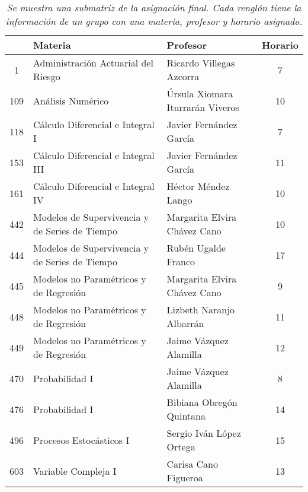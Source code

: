 \begin{table}[H]
\centering
\begin{tabular}{|c|p{7cm}|p{4.7cm}|c|}
\hline
\textbf{ } & \textbf{Materia} & \textbf{Profesor} & \textbf{Horario} \\ \hline
1 & Administración Actuarial del Riesgo & Ricardo Villegas Azcorra & 7 \\ \hline
109 & Análisis Numérico & Úrsula Xiomara Iturrarán Viveros & 10 \\ \hline
118 & Cálculo Diferencial e Integral I & Javier Fernández García & 7 \\ \hline
153 & Cálculo Diferencial e Integral III & Javier Fernández García & 11 \\ \hline
161 & Cálculo Diferencial e Integral IV & Héctor Méndez Lango & 10 \\ \hline
442 & Modelos de Supervivencia y de Series de Tiempo & Margarita Elvira Chávez Cano & 10 \\ \hline
444 & Modelos de Supervivencia y de Series de Tiempo & Rubén Ugalde Franco & 17 \\ \hline
445 & Modelos no Paramétricos y de Regresión & Margarita Elvira Chávez Cano & 9 \\ \hline
448 & Modelos no Paramétricos y de Regresión & Lizbeth Naranjo Albarrán & 11 \\ \hline
449 & Modelos no Paramétricos y de Regresión & Jaime Vázquez Alamilla & 12 \\ \hline
470 & Probabilidad I & Jaime Vázquez Alamilla & 8 \\ \hline
476 & Probabilidad I & Bibiana Obregón Quintana & 14 \\ \hline
496 & Procesos Estocásticos I & Sergio Iván López Ortega & 15 \\ \hline
603 & Variable Compleja I & Carisa Cano Figueroa & 13 \\ \hline
\end{tabular}
\caption[\textit{Submatriz con asignación final}]{\textit{Se muestra una submatriz de la asignación final. Cada renglón tiene la información de un grupo con una materia, profesor y horario asignado.}}\label{submatAsigFinal}
\end{table}




